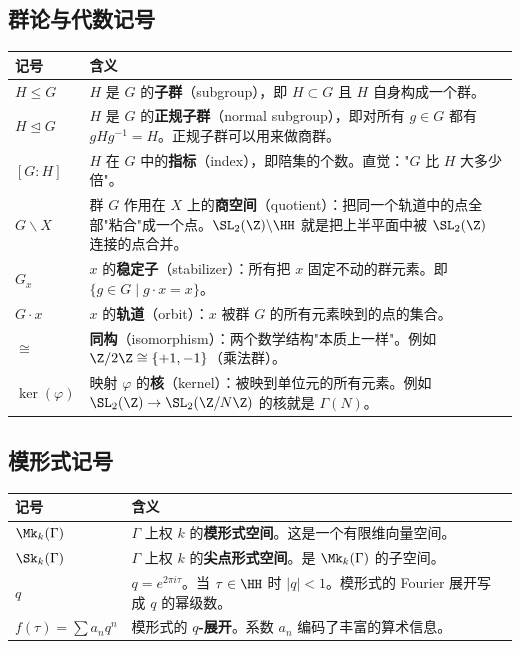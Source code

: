 \subsection*{群论与代数记号}

\begin{longtable}{@{}p{3.5cm}p{10cm}@{}}
\toprule
\textbf{记号} & \textbf{含义} \\
\midrule
$H \leq G$ &
  $H$ 是 $G$ 的\textbf{子群}（subgroup），即 $H \subset G$ 且 $H$ 自身构成一个群。 \\[4pt]
$H \trianglelefteq G$ &
  $H$ 是 $G$ 的\textbf{正规子群}（normal subgroup），即对所有 $g \in G$ 都有 $gHg^{-1} = H$。正规子群可以用来做商群。 \\[4pt]
$[G : H]$ &
  $H$ 在 $G$ 中的\textbf{指标}（index），即陪集的个数。直觉："$G$ 比 $H$ 大多少倍"。 \\[4pt]
$G \backslash X$ &
  群 $G$ 作用在 $X$ 上的\textbf{商空间}（quotient）：把同一个轨道中的点全部"粘合"成一个点。$\SL_2(\Z) \backslash \HH$ 就是把上半平面中被 $\SL_2(\Z)$ 连接的点合并。 \\[4pt]
$G_x$ &
  $x$ 的\textbf{稳定子}（stabilizer）：所有把 $x$ 固定不动的群元素。即 $\{g \in G \mid g \cdot x = x\}$。 \\[4pt]
$G \cdot x$ &
  $x$ 的\textbf{轨道}（orbit）：$x$ 被群 $G$ 的所有元素映到的点的集合。 \\[4pt]
$\cong$ &
  \textbf{同构}（isomorphism）：两个数学结构"本质上一样"。例如 $\Z/2\Z \cong \{+1, -1\}$（乘法群）。 \\[4pt]
$\ker(\varphi)$ &
  映射 $\varphi$ 的\textbf{核}（kernel）：被映到单位元的所有元素。例如 $\SL_2(\Z) \to \SL_2(\Z/N\Z)$ 的核就是 $\Gamma(N)$。 \\
\bottomrule
\end{longtable}

\subsection*{模形式记号}

\begin{longtable}{@{}p{3.5cm}p{10cm}@{}}
\toprule
\textbf{记号} & \textbf{含义} \\
\midrule
$\Mk_k(\Gamma)$ &
  $\Gamma$ 上权 $k$ 的\textbf{模形式空间}。这是一个有限维向量空间。 \\[4pt]
$\Sk_k(\Gamma)$ &
  $\Gamma$ 上权 $k$ 的\textbf{尖点形式空间}。是 $\Mk_k(\Gamma)$ 的子空间。 \\[4pt]
$q$ &
  $q = e^{2\pi i \tau}$。当 $\tau \in \HH$ 时 $|q| < 1$。模形式的 Fourier 展开写成 $q$ 的幂级数。 \\[4pt]
$f(\tau) = \sum a_n q^n$ &
  模形式的 \textbf{$q$-展开}。系数 $a_n$ 编码了丰富的算术信息。 \\
\bottomrule
\end{longtable}
